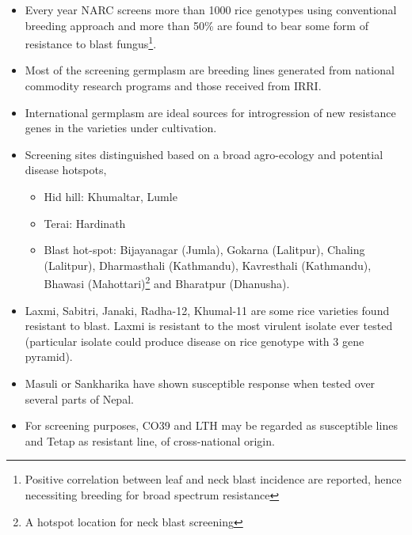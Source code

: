 \documentclass[11pt,dvipsnames,ignorenonframetext,aspectratio=169]{beamer}
\providecommand{\tightlist}{%
  \setlength{\itemsep}{0pt}\setlength{\parskip}{0pt}}
\begin{document}
\begin{frame}{}
\protect\hypertarget{section-2}{}
\footnotesize

\begin{itemize}
\tightlist
\item
  Every year NARC screens more than 1000 rice genotypes using
  conventional breeding approach and more than 50\% are found to bear
  some form of resistance to blast
  fungus\footnote[frame]{\scriptsize Positive correlation between leaf and neck blast incidence are reported, hence necessiting breeding for broad spectrum resistance}.
\item
  Most of the screening germplasm are breeding lines generated from
  national commodity research programs and those received from IRRI.
\item
  International germplasm are ideal sources for introgression of new
  resistance genes in the varieties under cultivation.
\item
  Screening sites distinguished based on a broad agro-ecology and
  potential disease hotspots,

  \begin{itemize}
  \footnotesize
  \item Hid hill: Khumaltar, Lumle
  \item Terai: Hardinath
  \item Blast hot-spot: Bijayanagar (Jumla), Gokarna (Lalitpur), Chaling (Lalitpur), Dharmasthali (Kathmandu), Kavresthali (Kathmandu), Bhawasi (Mahottari)\footnote[frame]{\scriptsize A hotspot location for neck blast screening} and Bharatpur (Dhanusha).
  \end{itemize}
\item
  Laxmi, Sabitri, Janaki, Radha-12, Khumal-11 are some rice varieties
  found resistant to blast. Laxmi is resistant to the most virulent
  isolate ever tested (particular isolate could produce disease on rice
  genotype with 3 gene pyramid).
\item
  Masuli or Sankharika have shown susceptible response when tested over
  several parts of Nepal.
\item
  For screening purposes, CO39 and LTH may be regarded as susceptible
  lines and Tetap as resistant line, of cross-national origin.
\end{itemize}
\end{frame}
\end{document}
